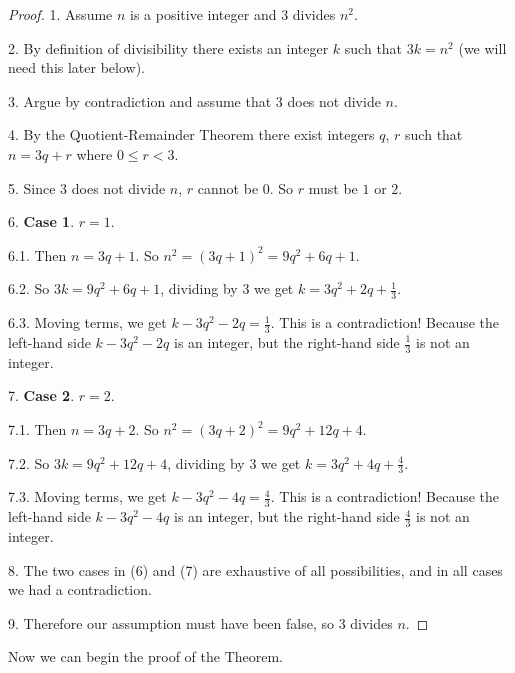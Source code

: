 \documentclass[14pt]{extarticle}
\begin{document}
\begin{proof} 

1. Assume $n$ is a positive integer and $3$ divides $n^2$. 

2. By definition of divisibility there exists an integer $k$ such that $3k = n^2$ (we will need this later below).

3. Argue by contradiction and assume that $3$ does not divide $n$.

4. By the Quotient-Remainder Theorem there exist integers $q$, $r$ such that $n = 3q + r$ where $0 \leq r < 3$.

5. Since $3$ does not divide $n$, $r$ cannot be $0$. So $r$ must be $1$ or $2$.

6. \textbf{Case 1}. $r = 1$.

6.1. Then $n = 3q + 1$. So $n^2 = (3q+1)^2 = 9q^2 + 6q + 1$.

6.2. So $3k = 9q^2 + 6q + 1$, dividing by 3 we get $k = 3q^2 + 2q + \frac{1}{3}$. 

6.3. Moving terms, we get $k - 3q^2 - 2q = \frac{1}{3}$. This is a contradiction! Because the left-hand side $k - 3q^2 - 2q$ is an integer, but the right-hand side $\frac{1}{3}$ is not an integer.

7. \textbf{Case 2}. $r = 2$.

7.1. Then $n = 3q + 2$. So $n^2 = (3q+2)^2 = 9q^2 + 12q + 4$.

7.2. So $3k = 9q^2 + 12q + 4$, dividing by 3 we get $k = 3q^2 + 4q + \frac{4}{3}$. 

7.3. Moving terms, we get $k - 3q^2 - 4q = \frac{4}{3}$. This is a contradiction! Because the left-hand side $k - 3q^2 - 4q$ is an integer, but the right-hand side $\frac{4}{3}$ is not an integer.

8. The two cases in (6) and (7) are exhaustive of all possibilities, and in all cases we had a contradiction.

9. Therefore our assumption must have been false, so $3$ divides $n$.
\end{proof}

Now we can begin the proof of the Theorem.
\end{document}
